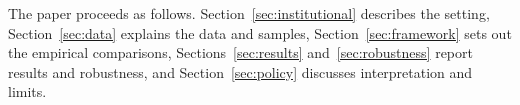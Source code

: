 The paper proceeds as follows. Section~\ref{sec:institutional} describes the setting, Section~\ref{sec:data} explains the data and samples, Section~\ref{sec:framework} sets out the empirical comparisons, Sections~\ref{sec:results} and~\ref{sec:robustness} report results and robustness, and Section~\ref{sec:policy} discusses interpretation and limits.
